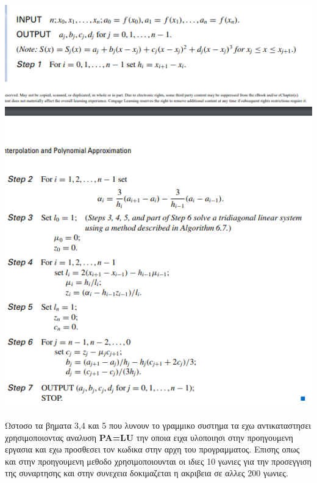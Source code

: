 \documentclass[a4paper,11pt]{article}
\begin{document}
\begin{enumerate}
\begin{center}
		\end{center}
		\begin{center}
			\emph{\includegraphics[scale=0.75]{splinesAlgorithm.png}}
		\end{center}
		\begin{center}
			Ωστοσο τα βηματα 3,4 και 5 που λυνουν το γραμμικο συστημα τα εχω αντικαταστησει χρησιμοποιοντας αναλυση \textbf{PA=LU} την οποια ειχα υλοποιησι στην προηγουμενη εργασια και εχω προσθεσει τον κωδικα στην αρχη του προγραμματος. Επισης οπως και στην προηγουμενη μεθοδο χρησιμοποιουνται οι ιδιες 10 γωνιες για την προσεγγιση της συναρτησης και στην συνεχεια δοκιμαζεται η ακριβεια σε αλλες 200 γωνιες.
		\end{center}
		\begin{center}

\end{center}
\end{enumerate}
\end{document}
